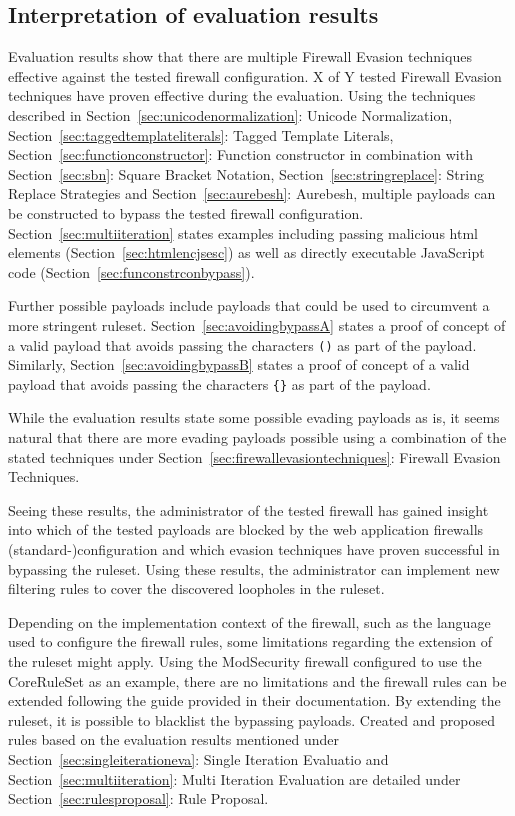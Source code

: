 \subsection{Interpretation of evaluation results}
\label{sec:evalinterpretation}
Evaluation results show that there are multiple Firewall Evasion techniques effective against the tested firewall configuration. {\color{red}X of Y} tested Firewall Evasion techniques have proven effective during the evaluation. Using the techniques described in Section~\ref{sec:unicodenormalization}: Unicode Normalization, Section~\ref{sec:taggedtemplateliterals}: Tagged Template Literals, Section~\ref{sec:functionconstructor}: Function constructor in combination with Section~\ref{sec:sbn}: Square Bracket Notation, Section~\ref{sec:stringreplace}: String Replace Strategies and Section~\ref{sec:aurebesh}: Aurebesh, multiple payloads can be constructed to bypass the tested firewall configuration. Section~\ref{sec:multiiteration} states examples including passing malicious html elements (Section~\ref{sec:htmlencjsesc}) as well as directly executable JavaScript code (Section~\ref{sec:funconstrconbypass}). 

Further possible payloads include payloads that could be used to circumvent a more stringent ruleset.
Section~\ref{sec:avoidingbypassA} states a proof of concept of a valid payload that avoids passing the characters \verb|()| as part of the payload.
Similarly, Section~\ref{sec:avoidingbypassB} states a proof of concept of a valid payload that avoids passing the characters \verb|{}| as part of the payload. 

While the evaluation results state some possible evading payloads as is, it seems natural that there are more evading payloads possible using a combination of the stated techniques under Section~\ref{sec:firewallevasiontechniques}: Firewall Evasion Techniques.

Seeing these results, the administrator of the tested firewall has gained insight into which of the tested payloads are blocked by the web application firewalls (standard-)configuration and which evasion techniques have proven successful in bypassing the ruleset. Using these results, the administrator can implement new filtering rules to cover the discovered loopholes in the ruleset.

Depending on the implementation context of the firewall, such as the language used to configure the firewall rules, some limitations regarding the extension of the ruleset might apply. Using the ModSecurity firewall configured to use the CoreRuleSet as an example, there are no limitations and the firewall rules can be extended following the guide provided in their documentation. By extending the ruleset, it is possible to blacklist the bypassing payloads. Created and proposed rules based on the evaluation results mentioned under Section~\ref{sec:singleiterationeva}: Single Iteration Evaluatio and Section~\ref{sec:multiiteration}: Multi Iteration Evaluation are detailed under Section~\ref{sec:rulesproposal}: Rule Proposal. 


